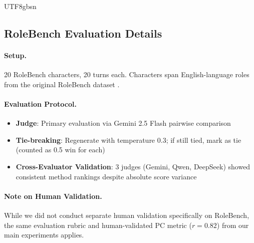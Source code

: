 \documentclass[11pt]{article}
\begin{document}
\begin{CJK*}{UTF8}{gbsn}
\begin{table}[h]
\centering
\scriptsize
{}
\caption{Cross-domain PC comparison.}
\label{tab:crossdomain}
\end{table}

\subsection{RoleBench Evaluation Details}
\label{sec:rolebench_details}

\paragraph{Setup.} 20 RoleBench characters, 20 turns each. Characters span English-language roles from the original RoleBench dataset \citep{wang2024rolellm}.

\paragraph{Evaluation Protocol.}
\begin{itemize}
    \item \textbf{Judge}: Primary evaluation via Gemini 2.5 Flash pairwise comparison
    \item \textbf{Tie-breaking}: Regenerate with temperature 0.3; if still tied, mark as tie (counted as 0.5 win for each)
    \item \textbf{Cross-Evaluator Validation}: 3 judges (Gemini, Qwen, DeepSeek) showed consistent method rankings despite absolute score variance
\end{itemize}

\paragraph{Note on Human Validation.} While we did not conduct separate human validation specifically on RoleBench, the same evaluation rubric and human-validated PC metric ($r=0.82$) from our main experiments applies.


\end{CJK*}
\end{document}
